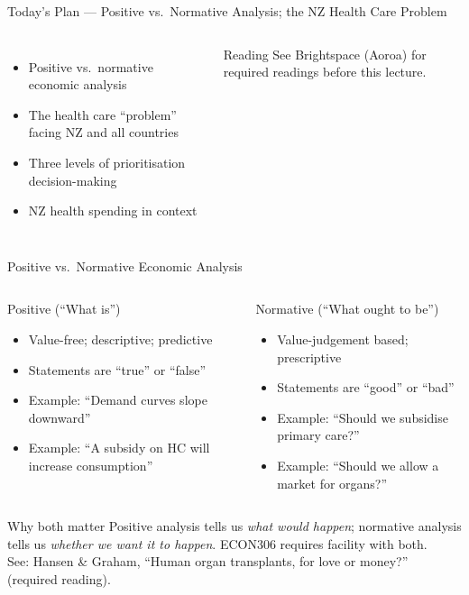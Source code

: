 \documentclass[aspectratio=169, 12pt]{beamer}
\newcommand{\planslide}[2]{%
  \begin{frame}{Today's Plan — #1}
    \begin{columns}
      \column{0.6\textwidth}
      \begin{itemize}#2\end{itemize}
      \column{0.38\textwidth}
      \begin{alertblock}{Reading}
        \footnotesize See Brightspace (Aoroa) for required readings before this lecture.
      \end{alertblock}
    \end{columns}
  \end{frame}}
\begin{document}
\planslide{Positive vs.\ Normative Analysis; the NZ Health Care Problem}{
  \item Positive vs.\ normative economic analysis
  \item The health care ``problem'' facing NZ and all countries
  \item Three levels of prioritisation decision-making
  \item NZ health spending in context
}

\begin{frame}{Positive vs.\ Normative Economic Analysis}
  \begin{columns}
      \begin{block}{Positive (``What is'')}
        \begin{itemize}
          \item Value-free; descriptive; predictive
          \item Statements are ``true'' or ``false''
          \item Example: ``Demand curves slope downward''
          \item Example: ``A subsidy on HC will increase consumption''
        \end{itemize}
      \end{block}
      \begin{alertblock}{Normative (``What ought to be'')}
        \begin{itemize}
          \item Value-judgement based; prescriptive
          \item Statements are ``good'' or ``bad''
          \item Example: ``Should we subsidise primary care?''
          \item Example: ``Should we allow a market for organs?''
        \end{itemize}
      \end{alertblock}
  \end{columns}
  \vspace{0.5em}
  \begin{exampleblock}{Why both matter}
    Positive analysis tells us \emph{what would happen}; normative analysis tells us
    \emph{whether we want it to happen}. ECON306 requires facility with both.\\[0.2em]
    {\footnotesize See: Hansen \& Graham, ``Human organ transplants, for love or money?'' (required reading).}
  \end{exampleblock}
\end{frame}
\end{document}
